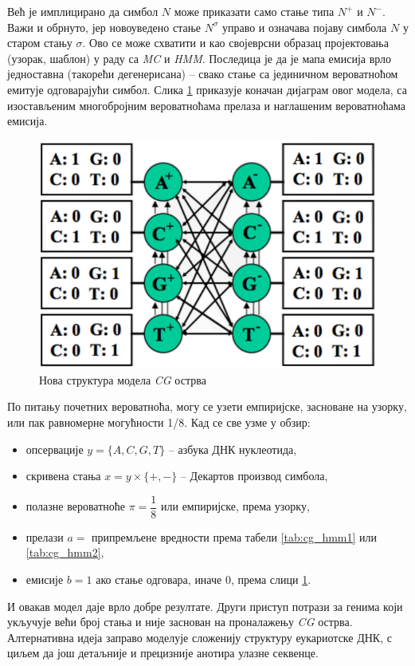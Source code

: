 \documentclass[12pt,oneside]{memoir}
\begin{document}
\begin{CJK}{UTF8}{ipxm}
Већ је имплицирано да симбол $N$ може приказати само стање типа $N^+$ и $N^-$. Важи и обрнуто, јер новоуведено стање $N^\sigma$ управо и означава појаву симбола $N$ у старом стању $\sigma$. Ово се може схватити и као својеврсни образац пројектовања (узорак, шаблон) у раду са \textit{MC} и \textit{HMM}. Последица је да је мапа емисија врло једноставна (такорећи дегенерисана) -- свако стање са јединичном вероватноћом емитује одговарајући симбол. Слика \ref{fig:cg_stanja} приказује коначан дијаграм овог модела, са изостављеним многобројним вероватноћама прелаза и наглашеним вероватноћама емисија.

\begin{figure}[H]
  \centering
  \includegraphics[width=.7\textwidth]{cg_stanja.png}
  \caption{Нова структура модела \textit{CG} острва \cite{kellis2021}}
  \label{fig:cg_stanja}
\end{figure}

По питању почетних вероватноћа, могу се узети емпиријске, засноване на узорку, или пак равномерне могућности 1/8. Кад се све узме у обзир:
\begin{itemize}
  \item опсервације $y = \{A, C, G, T\}$ -- азбука ДНК нуклеотида,
  \item скривена стања $x = y \times \{+, -\}$ -- Декартов производ симбола,
  \item полазне вероватноће $\pi = \dfrac{1}{8}$ или емпиријске, према узорку,
  \item прелази $a =$ припремљене вредности према табели \ref{tab:cg_hmm1} или \ref{tab:cg_hmm2},
  \item емисије $b = 1$ ако стање одговара, иначе $0$, према слици \ref{fig:cg_stanja}.
\end{itemize}

И овакав модел даје врло добре резултате. Други приступ потрази за генима који укључује већи број стања и није заснован на проналажењу \textit{CG} острва. Алтернативна идеја заправо моделује сложенију структуру еукариотске ДНК, с циљем да још детаљније и прецизније анотира улазне секвенце.


\end{CJK}
\end{document}
